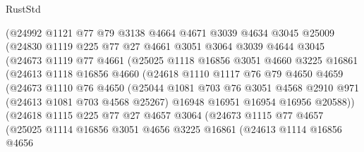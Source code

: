 \begin{lexlean}{RustStd}
\begin{coremodule}
              (@24992
                @1121
                @77
                @79
                @3138
                @4664
                @4671
                @3039
                @4634
                @3045
                @25009
                (@24830
                  @1119
                  @225
                  @77
                  @27
                  @4661
                  @3051
                  @3064
                  @3039
                  @4644
                  @3045
                  (@24673
                    @1119
                    @77
                    @4661
                    (@25025
                      @1118
                      @16856
                      @3051
                      @4660
                      @3225
                      @16861
                      (@24613
                        @1118
                        @16856
                        @4660
                        (@24618
                          @1110
                          @1117
                          @76
                          @79
                          @4650
                          @4659
                          (@24673
                            @1110
                            @76
                            @4650
                            (@25044
                              @1081
                              @703
                              @76
                              @3051
                              @4568
                              @2910
                              @971
                              (@24613 @1081 @703 @4568 @25267)
                              @16948
                              @16951
                              @16954
                              @16956
                              @20588))
                          (@24618
                            @1115
                            @225
                            @77
                            @27
                            @4657
                            @3064
                            (@24673
                              @1115
                              @77
                              @4657
                              (@25025
                                @1114
                                @16856
                                @3051
                                @4656
                                @3225
                                @16861
                                (@24613
                                  @1114
                                  @16856
                                  @4656

\end{coremodule}
\end{lexlean}
